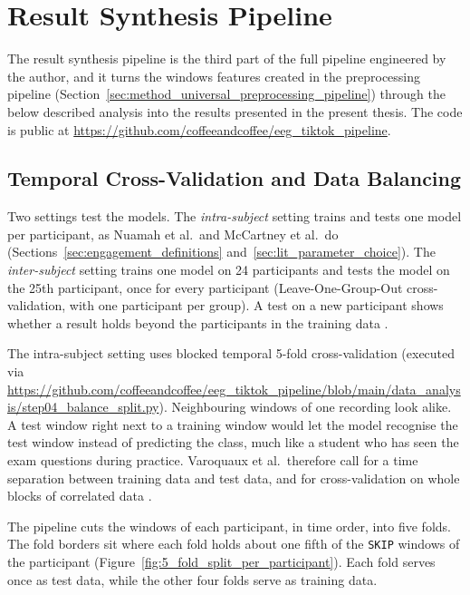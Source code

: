 \documentclass[12pt,a4paper]{report}
\begin{document}
\newpage
\section{Result Synthesis Pipeline}
\label{sec:method_result_synthesis_pipeline}

The result synthesis pipeline is the third part of the full pipeline engineered by the author, and it turns the windows features created in the preprocessing pipeline (Section~\ref{sec:method_universal_preprocessing_pipeline}) through the below described analysis into the results presented in the present thesis. The code is public at \url{https://github.com/coffeeandcoffee/eeg_tiktok_pipeline}.

\subsection{Temporal Cross-Validation and Data Balancing}
Two settings test the models. The \emph{intra-subject} setting trains and tests one model per participant, as Nuamah et al.\ and McCartney et al.\ do (Sections~\ref{sec:engagement_definitions} and~\ref{sec:lit_parameter_choice}). The \emph{inter-subject} setting trains one model on 24 participants and tests the model on the 25th participant, once for every participant (Leave-One-Group-Out cross-validation, with one participant per group). A test on a new participant shows whether a result holds beyond the participants in the training data \cite{varoquaux_assessing_2017}.

The intra-subject setting uses blocked temporal 5-fold cross-validation (executed via \url{https://github.com/coffeeandcoffee/eeg_tiktok_pipeline/blob/main/data_analysis/step04_balance_split.py}). Neighbouring windows of one recording look alike. A test window right next to a training window would let the model recognise the test window instead of predicting the class, much like a student who has seen the exam questions during practice. Varoquaux et al.\ therefore call for a time separation between training data and test data, and for cross-validation on whole blocks of correlated data \cite{varoquaux_assessing_2017}.

The pipeline cuts the windows of each participant, in time order, into five folds. The fold borders sit where each fold holds about one fifth of the \texttt{SKIP} windows of the participant (Figure~\ref{fig:5_fold_split_per_participant}). Each fold serves once as test data, while the other four folds serve as training data.
\end{document}

